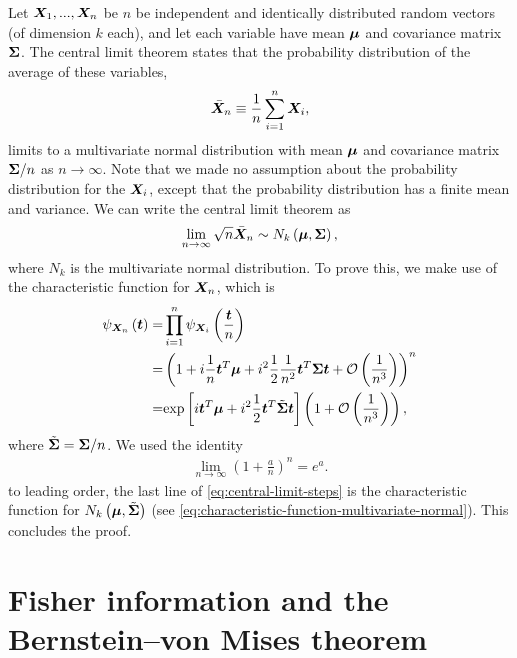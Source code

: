 Let ${\bm X}_1,...,{\bm X}_n$ be $n$ be independent and identically distributed 
random vectors (of dimension $k$ each), 
and let each variable have mean ${\bm \mu}$ and covariance matrix ${\bm \Sigma}$.
The central limit theorem states that the probability distribution of the
average of these variables, 
\begin{align}
    \bar{{\bm X}}_n
    \equiv
    \frac{1}{n}\sum_{i=1}^n{\bm X}_i
    ,
\end{align}
limits to a multivariate normal distribution with mean ${\bm \mu}$ and covariance matrix ${\bm \Sigma}/n$
as $n\to\infty$.
Note that we made no assumption about the probability distribution for
the ${\bm X}_i$, except that the probability distribution has a finite mean
and variance.
We can write the central limit theorem as
\begin{align}
    \lim_{n\to\infty} \sqrt{n}\bar{{\bm X}}_n
    \sim 
    N_k\left({\bm \mu},{\bm \Sigma}\right)
    ,
\end{align}
where $N_k$ is the multivariate normal distribution.
To prove this, we make use of the characteristic function for ${\bm X}_n$, which is
\begin{align}
    \label{eq:central-limit-steps}
    \psi_{{\bm X}_n}\left({\bm t}\right)
    =&
    \prod_{i=1}^n\psi_{{\bm X}_i}\left(\frac{{\bm t}}{n}\right)
    \nonumber\\
    =&
    \left(
        1 
        + 
        i\frac{1}{n}{\bm t}^T{\bm \mu} 
        + 
        i^2\frac{1}{2}\frac{1}{n^2}{\bm t}^T{\bm \Sigma}{\bm t} 
        + 
        \mathcal{O}\left(\frac{1}{n^3}\right)
    \right)^n
    \nonumber\\
    =&
    \mathrm{exp}\left[
        i{\bm t}^T{\bm \mu}
        + 
        i^2\frac{1}{2}{\bm t}^T\tilde{{\bm \Sigma}}{\bm t}
    \right]
    \left(1 + \mathcal{O}\left(\frac{1}{n^3}\right)\right)
    ,
\end{align}
where $\tilde{{\bm \Sigma}} = {\bm \Sigma}/n$.
We used the identity
\begin{align}
    \lim_{n\to\infty}\left(1+\frac{a}{n}\right)^n = e^a
    .
\end{align}
to leading order, the last line of \eqref{eq:central-limit-steps} is the
characteristic function for $N_k\left({\bm \mu},\tilde{{\bm \Sigma}}\right)$
(see \eqref{eq:characteristic-function-multivariate-normal}).
This concludes the proof.

\section{Fisher information and the Bernstein–von Mises theorem}

